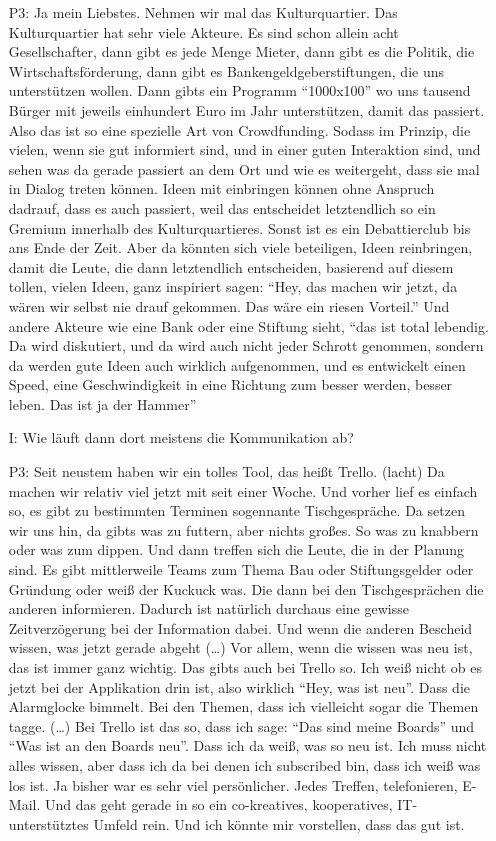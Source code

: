 \begin{itemize}
    \item[P3:] Ja mein Liebstes. Nehmen wir mal das Kulturquartier. Das Kulturquartier hat sehr viele Akteure. Es sind schon allein acht Gesellschafter, dann gibt es jede Menge Mieter, dann gibt es die Politik, die Wirtschaftsf{\"o}rderung, dann gibt es Bankengeldgeberstiftungen, die uns unterst{\"u}tzen wollen. Dann gibts ein Programm "`1000x100"' wo uns tausend B{\"u}rger mit jeweils einhundert Euro im Jahr unterst{\"u}tzen, damit das passiert. Also das ist so eine spezielle Art von Crowdfunding. Sodass im Prinzip, die vielen, wenn sie gut informiert sind, und in einer guten Interaktion sind, und sehen was da gerade passiert an dem Ort und wie es weitergeht, dass sie mal in Dialog treten k{\"o}nnen. Ideen mit einbringen k{\"o}nnen ohne Anspruch dadrauf, dass es auch passiert, weil das entscheidet letztendlich so ein Gremium innerhalb des Kulturquartieres. Sonst ist es ein Debattierclub bis ans Ende der Zeit. Aber da k{\"o}nnten sich viele beteiligen, Ideen reinbringen, damit die Leute, die dann letztendlich entscheiden, basierend auf diesem tollen, vielen Ideen, ganz inspiriert sagen: "`Hey, das machen wir jetzt, da w{\"a}ren wir selbst nie drauf gekommen. Das w{\"a}re ein riesen Vorteil."' Und andere Akteure wie eine Bank oder eine Stiftung sieht, "`das ist total lebendig. Da wird diskutiert, und da wird auch nicht jeder Schrott genommen, sondern da werden gute Ideen auch wirklich aufgenommen, und es entwickelt einen Speed, eine Geschwindigkeit in eine Richtung zum besser werden, besser leben. Das ist ja der Hammer"'
    \item[I:] Wie l{\"a}uft dann dort meistens die Kommunikation ab?
    \item[P3:] Seit neustem haben wir ein tolles Tool, das hei{\ss}t Trello. (lacht) Da machen wir relativ viel jetzt mit seit einer Woche. Und vorher lief es einfach so, es gibt zu bestimmten Terminen sogennante Tischgespr{\"a}che. Da setzen wir uns hin, da gibts was zu futtern, aber nichts gro{\ss}es. So was zu knabbern oder was zum dippen. Und dann treffen sich die Leute, die in der Planung sind. Es gibt mittlerweile Teams zum Thema Bau oder Stiftungsgelder oder Gr{\"u}ndung oder wei{\ss} der Kuckuck was. Die dann bei den Tischgespr{\"a}chen die anderen informieren. Dadurch ist nat{\"u}rlich durchaus eine gewisse Zeitverz{\"o}gerung bei der Information dabei. Und wenn die anderen Bescheid wissen, was jetzt gerade abgeht (\dots) Vor allem, wenn die wissen was neu ist, das ist immer ganz wichtig. Das gibts auch bei Trello so. Ich wei{\ss} nicht ob es jetzt bei der Applikation drin ist, also wirklich "`Hey, was ist neu"'. Dass die Alarmglocke bimmelt. Bei den Themen, dass ich vielleicht sogar die Themen tagge. (\dots) Bei Trello ist das so, dass ich sage: "`Das sind meine Boards"' und "`Was ist an den Boards neu"'. Dass ich da wei{\ss}, was so neu ist. Ich muss nicht alles wissen, aber dass ich da bei denen ich subscribed bin, dass ich wei{\ss} was los ist. Ja bisher war es sehr viel pers{\"o}nlicher. Jedes Treffen, telefonieren, E-Mail. Und das geht gerade in so ein co-kreatives, kooperatives, IT-unterst{\"u}tztes Umfeld rein. Und ich k{\"o}nnte mir vorstellen, dass	das gut ist.

\end{itemize}
